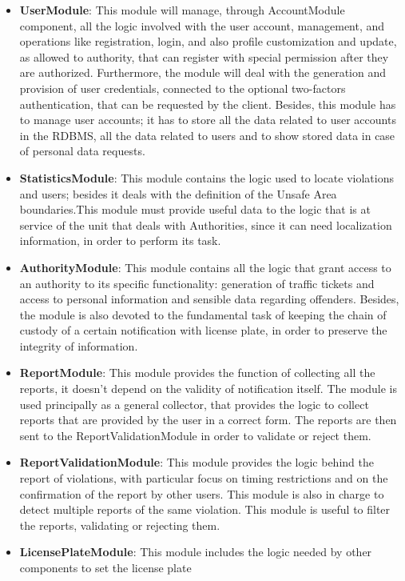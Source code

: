 \begin{itemize}
  \item \textbf{UserModule}: This module will manage, through AccountModule component, all the logic involved with 
  the user account, management, and operations like registration, login, and also profile customization and update, as 
  allowed to authority, that can register with special permission after they are authorized. Furthermore, the module 
  will deal with the generation and provision of user credentials, connected to the optional two-factors authentication, 
  that can be requested by the client. Besides, this module has to manage user accounts; it has to store all the data 
  related to user accounts in the RDBMS, all the data related to users and to show stored data in case of personal data requests.
  \item \textbf{StatisticsModule}: This module contains the logic used to locate violations and users; besides it deals with the 
  definition of the Unsafe Area boundaries.This module must provide useful data to the logic that is at service of the unit 
  that deals with  Authorities, since it can need localization information, in order to perform its task.
  \item \textbf{AuthorityModule}: This module contains all the logic that grant access to an authority to its specific functionality: 
  generation of traffic tickets and access to personal information and sensible data regarding offenders. Besides, 
  the module is also devoted to the fundamental task of keeping the chain of custody of a certain notification with 
  license plate, in order to preserve the integrity of information.
  \item \textbf{ReportModule}: This module provides the function of collecting all the reports, it doesn't depend on the validity
  of notification itself. The module is used principally as a general collector, that provides the logic to collect reports that are
  provided by the user in a correct form. The reports are then sent to the ReportValidationModule in order to validate or reject them. 
  \item \textbf{ReportValidationModule}: This module provides the logic behind the report of violations, with particular 
  focus on timing restrictions and on the confirmation of the report by other users. This module is also in charge 
  to detect multiple reports of the same violation. This module is useful to filter the reports, validating or rejecting them.
  \item \textbf{LicensePlateModule}: This module includes the logic needed by other components to set the license plate 

\end{itemize}
